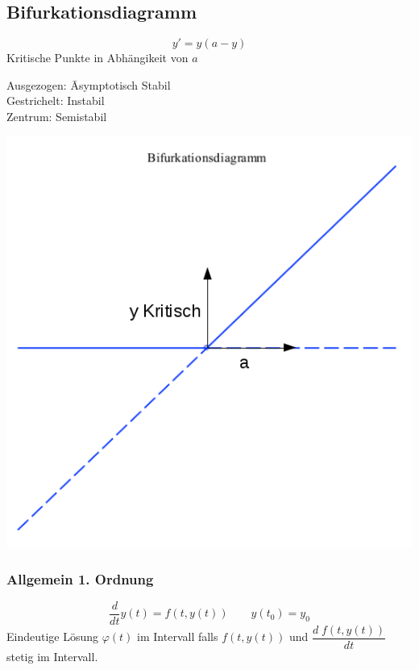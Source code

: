 \subsection{Bifurkationsdiagramm}
\begin{minipage}[h]{0.35\textwidth}
\[y'=y(a-y)\]
Kritische Punkte in Abhängikeit von $a$\\
\begin{tabbing}
Ausgezogen: \= Asymptotisch Stabil\\
Gestrichelt: \> Instabil\\
Zentrum: \> Semistabil\\
\end{tabbing}
\end{minipage}
\begin{minipage}[h]{0.35\textwidth}
	\includegraphics[width=1.0\textwidth]{images/Bifurkationsdiagramm.png}
\end{minipage}

\subsubsection{Allgemein 1. Ordnung}
\[ \dfrac{d}{dt}y(t)=f(t,y(t)) \qquad y(t_0)=y_0 \]
Eindeutige Lösung $\varphi(t)$ im Intervall falls $f(t,y(t))$ und $\dfrac{d \; f(t,y(t))}{dt}$ stetig im Intervall.